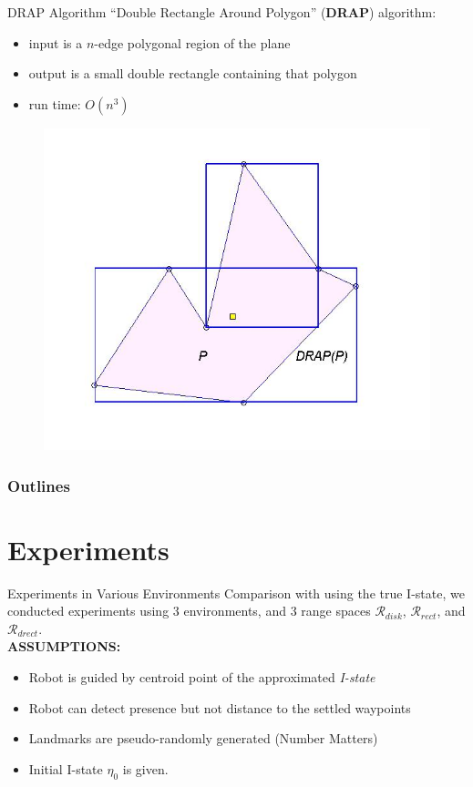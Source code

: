 \documentclass[10pt]{beamer}
\begin{document}
\begin{frame}{DRAP Algorithm}
  ``Double Rectangle Around Polygon'' (\textbf{DRAP}) algorithm:\\
  \begin{itemize}
  \item input is a $n$-edge polygonal region of the plane
  \item output is a small double rectangle containing that polygon
  \item run time: $O(n^3)$
  \end{itemize}
  \begin{figure}
    \includegraphics[scale=0.3]{figs/drap.jpg}
  \end{figure}
\end{frame}
\begin{frame}
  \frametitle{Outlines}
  \tableofcontents[]
\end{frame}

\section[Experiments]{Experiments}
\begin{frame}{Experiments in Various Environments}
  Comparison with using the true I-state, we conducted experiments using 3
  environments, and 3 range spaces $\mathcal{R}_{disk}$, $\mathcal{R}_{rect}$,
  and  $\mathcal{R}_{drect}$. \\
  \textbf{ASSUMPTIONS:}\\
  \begin{itemize}
  \item Robot is guided by centroid point of the approximated \emph{I-state}
  \item Robot can detect presence but not distance to the settled waypoints
  \item Landmarks are pseudo-randomly generated (Number Matters)
  \item Initial I-state $\eta_0$ is given.
  \end{itemize}  
\end{frame}
\end{document}
